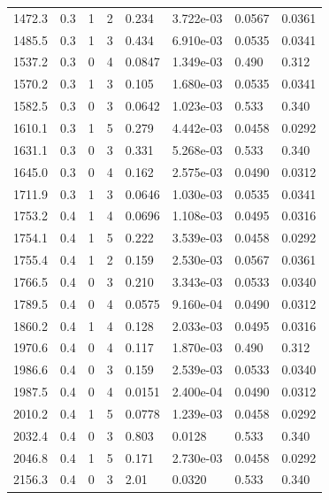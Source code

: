 \documentclass[preview]{standalone}
\begin{document}
{{{\begin{tabular}{L{1.2cm}C{1.2cm} C{0.3cm}C{0.5cm} C{1.4cm}C{1.4cm} C{1.4cm}C{1.4cm}}
  1472.3  &   0.3  & 1     &  2 &  0.234  & 3.722e-03  & 0.0567 &  0.0361   \\ 
  1485.5  &   0.3  & 1     &  3 &  0.434  & 6.910e-03  & 0.0535 &  0.0341   \\ 
  1537.2  &   0.3  & 0     &  4 &  0.0847  & 1.349e-03  & 0.490 &  0.312   \\ 
  1570.2  &   0.3  & 1     &  3 &  0.105  & 1.680e-03  & 0.0535 &  0.0341   \\ 
  1582.5  &   0.3  & 0     &  3 &  0.0642  & 1.023e-03  & 0.533 &  0.340   \\ 
  1610.1  &   0.3  & 1     &  5 &  0.279  & 4.442e-03  & 0.0458 &  0.0292   \\ 
  1631.1  &   0.3  & 0     &  3 &  0.331  & 5.268e-03  & 0.533 &  0.340   \\ 
  1645.0  &   0.3  & 0     &  4 &  0.162  & 2.575e-03  & 0.0490 &  0.0312   \\ 
  1711.9  &   0.3  & 1     &  3 &  0.0646  & 1.030e-03  & 0.0535 &  0.0341   \\ 
  1753.2  &   0.4  & 1     &  4 &  0.0696  & 1.108e-03  & 0.0495 &  0.0316   \\ 
  1754.1  &   0.4  & 1     &  5 &  0.222  & 3.539e-03  & 0.0458 &  0.0292   \\ 
  1755.4  &   0.4  & 1     &  2 &  0.159  & 2.530e-03  & 0.0567 &  0.0361   \\ 
  1766.5  &   0.4  & 0     &  3 &  0.210  & 3.343e-03  & 0.0533 &  0.0340   \\ 
  1789.5  &   0.4  & 0     &  4 &  0.0575  & 9.160e-04  & 0.0490 &  0.0312   \\ 
  1860.2  &   0.4  & 1     &  4 &  0.128  & 2.033e-03  & 0.0495 &  0.0316   \\ 
  1970.6  &   0.4  & 0     &  4 &  0.117  & 1.870e-03  & 0.490 &  0.312   \\ 
  1986.6  &   0.4  & 0     &  3 &  0.159  & 2.539e-03  & 0.0533 &  0.0340   \\ 
  1987.5  &   0.4  & 0     &  4 &  0.0151  & 2.400e-04  & 0.0490 &  0.0312   \\ 
  2010.2  &   0.4  & 1     &  5 &  0.0778  & 1.239e-03  & 0.0458 &  0.0292   \\ 
  2032.4  &   0.4  & 0     &  3 &  0.803  & 0.0128  & 0.533 &  0.340   \\ 
  2046.8  &   0.4  & 1     &  5 &  0.171  & 2.730e-03  & 0.0458 &  0.0292   \\ 
  2156.3  &   0.4  & 0     &  3 &  2.01  & 0.0320  & 0.533 &  0.340   \\ 

\end{tabular}}}}
\end{document}
